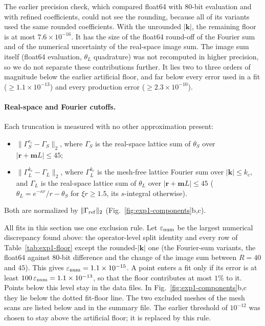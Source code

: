 The earlier precision check, which compared float64 with 80-bit evaluation and with refined coefficients, could not
see the rounding, because all of its variants used the same rounded coefficients. With the unrounded $|\mathbf k|$, the remaining floor is at most $7.6\times10^{-16}$. It has the size of the float64
round-off of the Fourier sum and of the numerical uncertainty of the real-space image sum. The image sum itself (float64
evaluation, $\theta_L$ quadrature) was not recomputed in higher precision, so we do not separate these contributions
further. It lies two to three orders of magnitude below the earlier artificial floor, and far below every error used in a fit
($\ge1.1\times10^{-13}$) and every production error ($\ge2.3\times10^{-10}$).

\begin{table}[t]
\centering\small
\caption{Floor of the comparison between the mesh-free Fourier sum $\Gamma_L^{\rm F}$ ($k_c=2\xi\cdot6.5$) and the
real-space image sum $\Gamma_L$ ($|\mathbf r+\mathbf mL|\le45$), $\|\Gamma_L^{\rm F}-\Gamma_L\|_2/\|\Gamma_{\rm
ref}\|_2$, range over case~A, a perturbed lattice and a uniform configuration ($N=128$, seed~1) at $\xi=0.7$ and $1$.}
\label{tab:exp1-floor}

\end{table}

\paragraph{Real-space and Fourier cutoffs.}
Each truncation is measured with no other approximation present:
\begin{itemize}
\item $\|\Gamma_S^{r_c}-\Gamma_S\|_2$, where $\Gamma_S$ is the real-space lattice sum of $\theta_S$ over
  $|\mathbf r+\mathbf mL|\le45$;
\item $\|\Gamma_L^{k_c}-\Gamma_L\|_2$, where $\Gamma_L^{k_c}$ is the mesh-free lattice Fourier sum over
  $|\mathbf k|\le k_c$, and $\Gamma_L$ is the real-space lattice sum of $\theta_L$ over $|\mathbf r+\mathbf mL|\le45$
  ($\theta_L=e^{-\kappa r}/r-\theta_S$ for $\xi r\ge1.5$, its $s$-integral otherwise).
\end{itemize}
Both are normalized by $\|\Gamma_{\rm ref}\|_2$ (Fig.~\ref{fig:exp1-components}b,c).

All fits in this section use one exclusion rule. Let $\varepsilon_{\rm num}$ be the largest numerical discrepancy found
above: the operator-level split identity and every row of Table~\ref{tab:exp1-floor} except the rounded-$|\mathbf k|$ one
(the Fourier-sum variants, the float64 against 80-bit difference and the change of the image sum between $R=40$ and
$45$). This gives $\varepsilon_{\rm num}=1.1\times10^{-15}$. A point enters a fit
only if its error is at least $100\,\varepsilon_{\rm num}=1.1\times10^{-13}$, so that the floor contributes at most $1\%$ to it.
Points below this level stay in the data files. In Fig.~\ref{fig:exp1-components}b,c they lie below the dotted
fit-floor line. The two excluded meshes of the mesh scans are listed below and in the summary file. The earlier
threshold of $10^{-12}$ was chosen to stay above the artificial floor; it is replaced by this rule.

